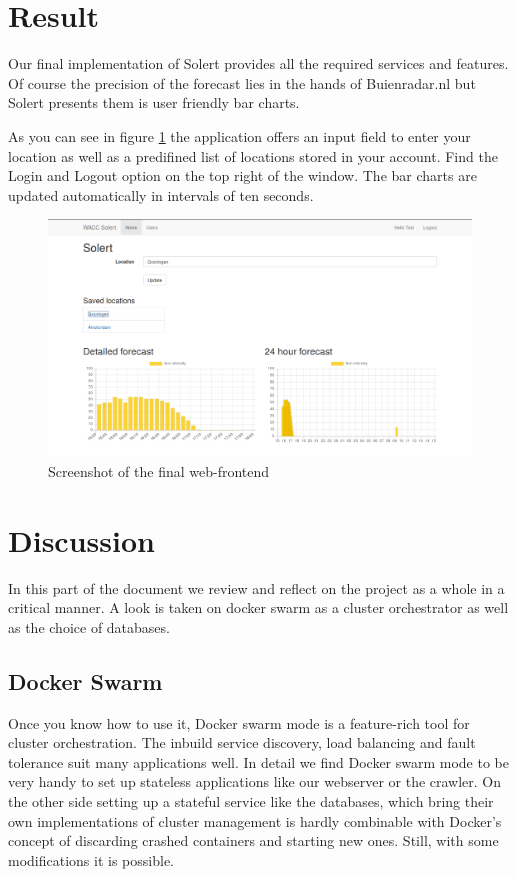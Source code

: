 \documentclass[a4paper]{article}
\begin{document}
\section{Result}

Our final implementation of Solert provides all the required services and features. Of course the precision of the forecast lies in the hands of Buienradar.nl but Solert presents them is user friendly bar charts.

As you can see in figure \ref{fig:screenshot} the application offers an input field to enter your location as well as a predifined list of locations stored in your account. Find the Login and Logout option on the top right of the window.
The bar charts are updated automatically in intervals of ten seconds.

\begin{figure}[ht]
	\centering
	\includegraphics[width = \linewidth]{screenshot}
	\caption{Screenshot of the final web-frontend}
	\label{fig:screenshot}
\end{figure}

\section{Discussion}
In this part of the document we review and reflect on the project as a whole in a critical manner. A look is taken on docker swarm as a cluster orchestrator as well as the choice of databases.

\subsection{Docker Swarm}
Once you know how to use it, Docker swarm mode is a feature-rich tool for cluster orchestration. The inbuild service discovery, load balancing and fault tolerance suit many applications well. In detail we find Docker swarm mode to be very handy to set up stateless applications like our webserver or the crawler. On the other side setting up a stateful service like the databases, which bring their own implementations of cluster management is hardly combinable with Docker's concept of discarding crashed containers and starting new ones. Still, with some modifications it is possible.
\end{document}
